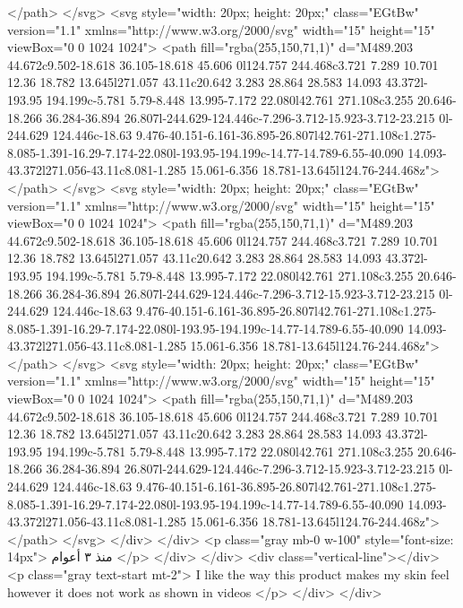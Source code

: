                       </path>
                    </svg>
                    <svg style="width: 20px; height: 20px;" class="EGtBw" version="1.1"
                      xmlns="http://www.w3.org/2000/svg" width="15" height="15" viewBox="0 0 1024 1024">
                      <path fill="rgba(255,150,71,1)"
                        d="M489.203 44.672c9.502-18.618 36.105-18.618 45.606 0l124.757 244.468c3.721 7.289 10.701 12.36 18.782 13.645l271.057 43.11c20.642 3.283 28.864 28.583 14.093 43.372l-193.95 194.199c-5.781 5.79-8.448 13.995-7.172 22.080l42.761 271.108c3.255 20.646-18.266 36.284-36.894 26.807l-244.629-124.446c-7.296-3.712-15.923-3.712-23.215 0l-244.629 124.446c-18.63 9.476-40.151-6.161-36.895-26.807l42.761-271.108c1.275-8.085-1.391-16.29-7.174-22.080l-193.95-194.199c-14.77-14.789-6.55-40.090 14.093-43.372l271.056-43.11c8.081-1.285 15.061-6.356 18.781-13.645l124.76-244.468z">
                      </path>
                    </svg>
                    <svg style="width: 20px; height: 20px;" class="EGtBw" version="1.1"
                      xmlns="http://www.w3.org/2000/svg" width="15" height="15" viewBox="0 0 1024 1024">
                      <path fill="rgba(255,150,71,1)"
                        d="M489.203 44.672c9.502-18.618 36.105-18.618 45.606 0l124.757 244.468c3.721 7.289 10.701 12.36 18.782 13.645l271.057 43.11c20.642 3.283 28.864 28.583 14.093 43.372l-193.95 194.199c-5.781 5.79-8.448 13.995-7.172 22.080l42.761 271.108c3.255 20.646-18.266 36.284-36.894 26.807l-244.629-124.446c-7.296-3.712-15.923-3.712-23.215 0l-244.629 124.446c-18.63 9.476-40.151-6.161-36.895-26.807l42.761-271.108c1.275-8.085-1.391-16.29-7.174-22.080l-193.95-194.199c-14.77-14.789-6.55-40.090 14.093-43.372l271.056-43.11c8.081-1.285 15.061-6.356 18.781-13.645l124.76-244.468z">
                      </path>
                    </svg>
                    <svg style="width: 20px; height: 20px;" class="EGtBw" version="1.1"
                      xmlns="http://www.w3.org/2000/svg" width="15" height="15" viewBox="0 0 1024 1024">
                      <path fill="rgba(255,150,71,1)"
                        d="M489.203 44.672c9.502-18.618 36.105-18.618 45.606 0l124.757 244.468c3.721 7.289 10.701 12.36 18.782 13.645l271.057 43.11c20.642 3.283 28.864 28.583 14.093 43.372l-193.95 194.199c-5.781 5.79-8.448 13.995-7.172 22.080l42.761 271.108c3.255 20.646-18.266 36.284-36.894 26.807l-244.629-124.446c-7.296-3.712-15.923-3.712-23.215 0l-244.629 124.446c-18.63 9.476-40.151-6.161-36.895-26.807l42.761-271.108c1.275-8.085-1.391-16.29-7.174-22.080l-193.95-194.199c-14.77-14.789-6.55-40.090 14.093-43.372l271.056-43.11c8.081-1.285 15.061-6.356 18.781-13.645l124.76-244.468z">
                      </path>
                    </svg>
                  </div>
                </div>
                <p class="gray mb-0 w-100" style="font-size: 14px">
                  منذ ٣ أعوام
                </p>
              </div>
            </div>
            <div class="vertical-line"></div>
            <p class="gray text-start mt-2">
              I like the way this product makes my skin feel however it does not
              work as shown in videos
            </p>
          </div>
        </div>

